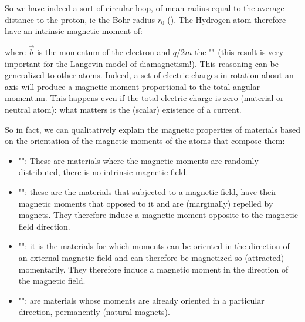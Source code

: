 	So we have indeed a sort of circular loop, of mean radius equal to the average distance to the proton, ie the Bohr radius $r_0$ (). The Hydrogen atom therefore have an intrinsic magnetic moment of:
	
	where $\vec{b}$ is the momentum of the electron and $q / 2m$ the "" (this result is very important for the Langevin model of diamagnetism!). This reasoning can be generalized to other atoms. Indeed, a set of electric charges in rotation about an axis will produce a magnetic moment proportional to the total angular momentum. This happens even if the total electric charge is zero (material or neutral atom): what matters is the (scalar) existence of a current.
	
	So in fact, we can qualitatively explain the magnetic properties of materials based on the orientation of the magnetic moments of the atoms that compose them:
	\begin{itemize}
		\item "": These are materials where the magnetic moments are randomly distributed, there is no intrinsic magnetic field.

		\item "": these are the materials that subjected to a magnetic field, have their magnetic moments that opposed to it and are (marginally)  repelled by magnets. They therefore induce a magnetic moment opposite to the magnetic field direction.
		
		\item "": it is the materials for which moments can be oriented in the direction of an external magnetic field and can therefore be magnetized so (attracted) momentarily. They therefore induce a magnetic moment in the direction of the magnetic field.

		\item "": are materials whose moments are already oriented in a particular direction, permanently (natural magnets).
	\end{itemize}
